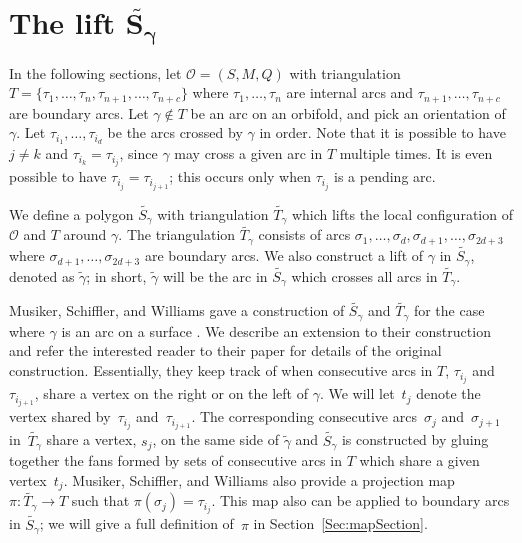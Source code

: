 \documentclass[11pt]{article}
\numberwithin{equation}{section}
\begin{document}
\setcounter{section}{4}
\setcounter{subsection}{3}
\setcounter{subsubsection}{0}
\setcounter{Theorem}{5}
\setcounter{equation}{0}
\section[The lift $\widetilde{S_\gamma}$]{The lift $\boldsymbol{\widetilde{S_\gamma}}$}\label{sec:lift}

In the following sections, let $\mathcal{O} = (S,M,Q)$ with triangulation $T = \{ \tau_1,\ldots, \tau_n, \tau_{n+1},\ldots, \tau_{n+c}\}$ where $\tau_1,\ldots, \tau_n$ are internal arcs and $\tau_{n+1},\ldots, \tau_{n+c}$ are boundary arcs. Let $\gamma \notin T$ be an arc on an orbifold, and pick an orientation of $\gamma$. Let $\tau_{i_1},\ldots, \tau_{i_d}$ be the arcs crossed by $\gamma$ in order. Note that it is possible to have $j \neq k$ and $\tau_{i_k} = \tau_{i_j}$, since $\gamma$ may cross a given arc in $T$ multiple times. It is even possible to have $\tau_{i_j} = \tau_{i_{j+1}}$; this occurs only when $\tau_{i_j}$ is a pending arc.

We define a polygon $\widetilde{S_\gamma}$ with triangulation $\widetilde{T_\gamma}$ which lifts the local configuration of $\mathcal{O}$ and $T$ around $\gamma$. The triangulation $\widetilde{T_\gamma}$ consists of arcs $\sigma_1,\ldots, \sigma_d,\sigma_{d+1},\ldots, \sigma_{2d + 3}$ where $\sigma_{d+1},\ldots, \sigma_{2d + 3}$ are boundary arcs. We also construct a lift of $\gamma$ in $\widetilde{S_\gamma}$, denoted as $\widetilde{\gamma}$; in short, $\widetilde{\gamma}$ will be the arc in $\widetilde{S_\gamma}$ which crosses all arcs in $\widetilde{T_\gamma}$.

 Musiker, Schiffler, and Williams gave a construction of $\widetilde{S_\gamma}$ and $\widetilde{T_\gamma}$ for the case where $\gamma$ is an arc on a surface \cite{MSW}. We describe an extension to their construction and refer the interested reader to their paper for details of the original construction. Essentially, they keep track of when consecutive arcs in $T$, $\tau_{i_j}$ and $\tau_{i_{j+1}}$, share a vertex on the right or on the left of $\gamma$. We will let~$t_j$ denote the vertex shared by~$\tau_{i_j}$ and~$\tau_{i_{j+1}}$.
The corresponding consecutive arcs~$\sigma_j$ and~$\sigma_{j+1}$ in~$\widetilde{T_\gamma}$ share a vertex, $s_j$, on the same side of $\widetilde{\gamma}$ and $\widetilde{S_\gamma}$ is constructed by gluing together the fans formed by sets of consecutive arcs in $T$ which share a given vertex~$t_j$. Musiker, Schiffler, and Williams also provide a projection map $\pi\colon \widetilde{T_\gamma} \to T$ such that $\pi(\sigma_j) = \tau_{i_j}$. This map also can be applied to boundary arcs in $\widetilde{S_\gamma}$; we will give a full definition of~$\pi$ in Section~\ref{Sec:mapSection}.
\end{document}
